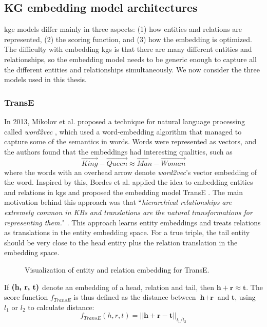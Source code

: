 \subsection{KG embedding model architectures}
\label{KG_embeddings_section}
\gls{kge} models differ mainly in three aspects: (1) how entities and relations are represented, (2) the scoring function, and (3) how the embedding is optimized. The difficulty with embedding \glspl{kg} is that there are many different entities and relationships, so the embedding model needs to be generic enough to capture all the different entities and relationships simultaneously. We now consider the three models used in this thesis.

\subsubsection{TransE}
\label{TransE_peaked_in_2013}
In 2013, Mikolov et al. proposed a technique for natural language processing called \textit{word2vec} \cite{mikolov2013distributed,mikolov2013efficient}, which used a word-embedding algorithm that managed to capture some of the semantics in words. Words were represented as vectors, and the authors found that the embeddings had interesting qualities, such as
\[\overrightarrow{King} - \overrightarrow{Queen} \approx \overrightarrow{Man} -\overrightarrow{Woman}\]
where the words with an overhead arrow denote \textit{word2vec}'s vector embedding of the word. Inspired by this, Bordes et al. applied the idea to embedding entities and relations in \glspl{kg} and proposed the embedding model TransE \cite{TransE}. The main motivation behind this approach was that ``\textit{hierarchical relationships are extremely common in KBs and translations are the natural transformations for representing them.}" \cite{TransE}. This approach learns entity embeddings and treats relations as translations in the entity embedding space.  For a true triple, the tail entity should be very close to the head entity plus the relation translation in the embedding space. 

\begin{figure}[htp]
    \centering
    
    \caption[TransE embedding.]{Visualization of entity and relation embedding for TransE.}
    \label{IKEA_TransE}
\end{figure}

If $\text{\textbf{(h, r, t)}}$ denote an embedding of a head, relation and tail, then $\textbf{h} + \textbf{r} \approx \textbf{t}$. The score function $f_{TransE}$ is thus defined as the distance between $\textbf{h} + \textbf{r}$ and $\textbf{t}$, using $l_1$ or $l_2$ to calculate distance:
\[f_{TransE}(h, r, t) = ||\textbf{h} + \textbf{r} - \textbf{t}||_{l_1/l_2}\]


